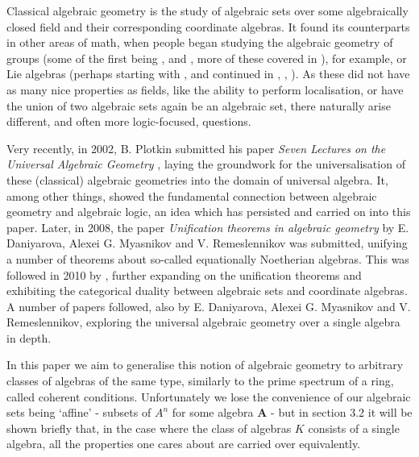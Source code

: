 \documentclass{article}
\theoremstyle{plain}
\theoremstyle{definition}
\begin{document}
Classical algebraic geometry is the study of algebraic sets over some algebraically closed field and their corresponding coordinate algebras.
It found its counterparts in other areas of math, when people began studying the algebraic geometry of groups (some of the first being \cite{GroupsWithParExp}, \cite{OneVarEqinFreeGroups} and \cite{VerbalTopology}, more of these covered in \cite{daniyarova2011algebraicgeometryalgebraicstructures}), for example, or Lie algebras (perhaps starting with \cite{ZeroDivInAmal}, and continued in \cite{Daniyarova_2005}, \cite{Daniyarova_2006}, \cite{2Daniyarova_2006}).
As these did not have as many nice properties as fields, like the ability to perform localisation, or have the union of two algebraic sets again be an algebraic set, there naturally arise different, and often more logic-focused, questions.\par
Very recently, in 2002, B. Plotkin submitted his paper \textit{Seven Lectures on the Universal Algebraic Geometry} \cite{plotkin2002sevenlecturesuniversalalgebraic}, laying the groundwork for the universalisation of these (classical) algebraic geometries into the domain of universal algebra.
It, among other things, showed the fundamental connection between algebraic geometry and algebraic logic, an idea which has persisted and carried on into this paper.
Later, in 2008, the paper \textit{Unification theorems in algebraic geometry} by E. Daniyarova, Alexei G. Myasnikov and V. Remeslennikov \cite{Daniyarova2008UnificationTI} was submitted, unifying a number of theorems about so-called equationally Noetherian algebras.
This was followed in 2010 by \cite{daniyarova2011algebraicgeometryalgebraicstructures}, further expanding on the unification theorems and exhibiting the categorical duality between algebraic sets and coordinate algebras.
A number of papers followed, also by E. Daniyarova, Alexei G. Myasnikov and V. Remeslennikov, exploring the universal algebraic geometry over a single algebra in depth.\par
In this paper we aim to generalise this notion of algebraic geometry to arbitrary classes of algebras of the same type, similarly to the prime spectrum of a ring, called coherent conditions.
Unfortunately we lose the convenience of our algebraic sets being `affine' - subsets of $A^n$ for some algebra $\mathbf{A}$ - but in section 3.2 it will be shown briefly that, in the case where the class of algebras $K$ consists of a single algebra, all the properties one cares about are carried over equivalently.\par
\end{document}
